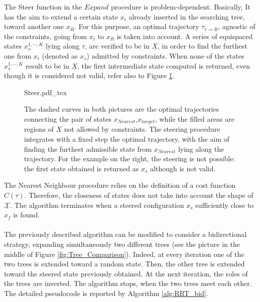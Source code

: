 The Steer function in the $Expand$ procedure is problem-dependent. Basically, It has the aim to extend a certain state $x_i$ already inserted in the searching tree, toward another one $x_R$. For this purpose, an optimal trajectory $\tau_{ i \rightarrow R}$, agnostic of the constraints, going from $x_i$ to $x_R$ is taken into account. A series of equispaced states $x^{1,\cdots,K}_s$ lying along $\tau$, are verified to be in $\underline{X}$, in order to find the furthest one from $x_i$ (denoted as $x_s$) admitted by constraints. When none of the states $x^{1,\cdots,K}_s$ result to be in $\underline{X}$, the first intermediate state computed is returned, even though it is considered not valid, refer also to Figure \ref{fig:Steer}.
\begin{figure}
	\centering
\def\svgwidth{0.8 \textwidth}
{Steer.pdf_tex} 
	\caption{The dashed curves in both pictures are the optimal trajectories connecting the pair of states $x_{Nearest}$,$x_{target}$, while the filled areas are regions of $X$ not allowed by constraints.	
	The steering procedure integrates with a fixed step the optimal trajectory, with the aim of finding the furthest admissible state from $x_{Nearest}$ lying along the trajectory. For the example on the right, the steering is not possible: the first state obtained is returned as $x_s$ although is not valid.}
	\label{fig:Steer}
\end{figure} 



The Nearest Neighbour procedure relies on the definition of a cost function $C(\tau)$. Therefore, the closeness of states does not take into account the shape of $\underline{\mathcal{X}}$.
The algorithm terminates when a steered configuration $x_s$ sufficiently close to $x_f$ is found.     
\\
\\
The previously described algorithm can be modified to consider a bidirectional strategy, expanding simultaneously two different trees \cite{RRT_bid} (see the picture in the middle of Figure \ref{fig:Tree_Comparison}). Indeed, at every iteration one of the two trees is extended toward a random state. Then, the other tree is extended toward the steered state previously obtained. At the next iteration, the roles of the trees are inverted. The algorithm stops, when the two trees meet each other. The detailed pseudocode is reported by Algorithm \ref{alg:RRT_bid}.

